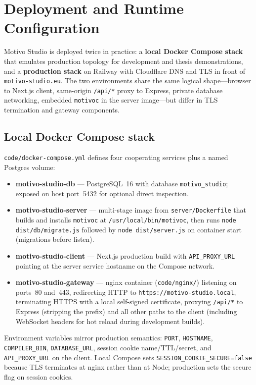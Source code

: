 \section{Deployment and Runtime Configuration}\label{sec:deployment}

Motivo Studio is deployed twice in practice: a \textbf{local Docker Compose stack} that emulates production topology
for development and thesis demonstrations, and a \textbf{production stack} on Railway with Cloudflare DNS and TLS in
front of \texttt{motivo-studio.eu}.
The two environments share the same logical shape---browser to Next.js client, same-origin \texttt{/api/*} proxy to
Express, private database networking, embedded \texttt{motivoc} in the server image---but differ in TLS termination
and gateway components.

\subsection{Local Docker Compose stack}\label{subsec:local-docker}

\texttt{code/docker-compose.yml} defines four cooperating services plus a named Postgres volume:

\begin{itemize}
  \item \textbf{motivo-studio-db} --- PostgreSQL~16 with database \texttt{motivo\_studio}; exposed on host port~5432 for
    optional direct inspection.
  \item \textbf{motivo-studio-server} --- multi-stage image from \texttt{server/Dockerfile} that builds and installs
    \texttt{motivoc} at \texttt{/usr/local/bin/motivoc}, then runs \texttt{node dist/db/migrate.js} followed by
    \texttt{node dist/server.js} on container start (migrations before listen).
  \item \textbf{motivo-studio-client} --- Next.js production build with \texttt{API\_PROXY\_URL} pointing at the server
    service hostname on the Compose network.
  \item \textbf{motivo-studio-gateway} --- nginx container (\texttt{code/nginx/}) listening on ports~80 and~443,
    redirecting HTTP to \texttt{https://motivo-studio.local}, terminating HTTPS with a local self-signed
    certificate, proxying
    \texttt{/api/*} to Express (stripping the prefix) and all other paths to the client (including WebSocket headers for
    hot reload during development builds).
\end{itemize}

Environment variables mirror production semantics: \texttt{PORT}, \texttt{HOSTNAME}, \texttt{COMPILER\_BIN},
\texttt{DATABASE\_URL}, session cookie name/TTL/secret, and \texttt{API\_PROXY\_URL} on the client.
Local Compose sets \texttt{SESSION\_COOKIE\_SECURE=false} because TLS terminates at nginx rather than at Node;
production sets the secure flag on session cookies.

